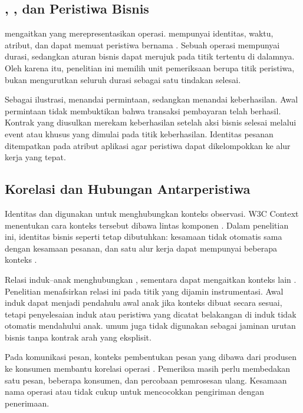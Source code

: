 \subsection{, , dan Peristiwa Bisnis}
 mengaitkan  yang merepresentasikan operasi.  mempunyai identitas, waktu, atribut, dan dapat memuat peristiwa bernama \citep{oteltraces}. Sebuah operasi mempunyai durasi, sedangkan aturan bisnis dapat merujuk pada titik tertentu di dalamnya. Oleh karena itu, penelitian ini memilih unit pemeriksaan berupa titik peristiwa, bukan mengurutkan seluruh durasi  sebagai satu tindakan selesai.

Sebagai ilustrasi,  menandai permintaan, sedangkan  menandai keberhasilan. Awal  permintaan tidak membuktikan bahwa transaksi pembayaran telah berhasil. Kontrak yang diusulkan merekam keberhasilan setelah aksi bisnis selesai melalui  event atau  khusus yang dimulai pada titik keberhasilan. Identitas pesanan ditempatkan pada atribut aplikasi agar peristiwa dapat dikelompokkan ke alur kerja yang tepat.

\subsection{Korelasi dan Hubungan Antarperistiwa}
Identitas  dan  digunakan untuk menghubungkan konteks observasi. W3C  Context menentukan cara konteks tersebut dibawa lintas komponen \citep{w3ctrace}. Dalam penelitian ini, identitas bisnis seperti  tetap dibutuhkan: kesamaan  tidak otomatis sama dengan kesamaan pesanan, dan satu alur kerja dapat mempunyai beberapa konteks .

Relasi induk--anak menghubungkan , sementara  dapat mengaitkan konteks  lain \citep{otelapi}. Penelitian menafsirkan relasi ini pada titik yang dijamin instrumentasi. Awal induk dapat menjadi pendahulu awal anak jika konteks dibuat secara sesuai, tetapi penyelesaian induk atau peristiwa yang dicatat belakangan di induk tidak otomatis mendahului anak.  umum juga tidak digunakan sebagai jaminan urutan bisnis tanpa kontrak arah yang eksplisit.

Pada komunikasi pesan, konteks pembentukan pesan yang dibawa dari produsen ke konsumen membantu korelasi operasi \citep{otelmessaging}. Pemeriksa masih perlu membedakan satu pesan, beberapa konsumen, dan percobaan pemrosesan ulang. Kesamaan nama operasi atau  tidak cukup untuk mencocokkan pengiriman dengan penerimaan.

